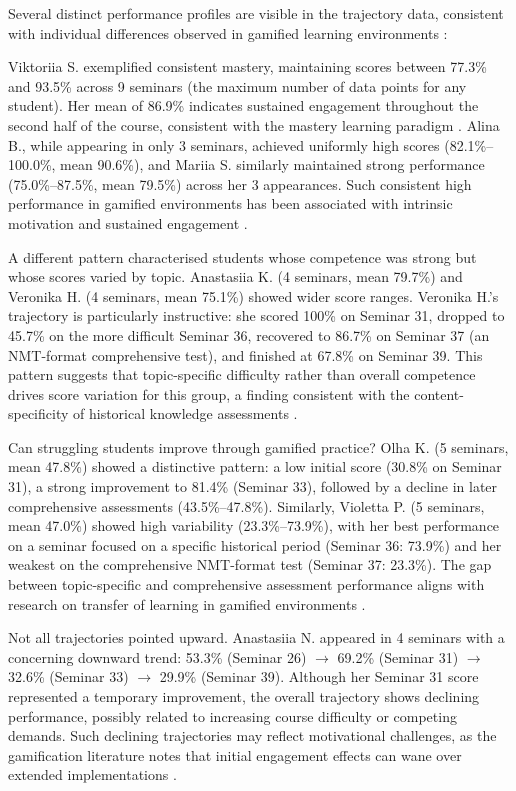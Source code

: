 Several distinct performance profiles are visible in the trajectory data, consistent with individual differences observed in gamified learning environments \cite{Qian2016, Lampropoulos2024, Schafer2017}:

Viktoriia S. exemplified consistent mastery, maintaining scores between 77.3\% and 93.5\% across 9 seminars (the maximum number of data points for any student). Her mean of 86.9\% indicates sustained engagement throughout the second half of the course, consistent with the mastery learning paradigm \cite{Hattie2009}. Alina B., while appearing in only 3 seminars, achieved uniformly high scores (82.1\%--100.0\%, mean 90.6\%), and Mariia S. similarly maintained strong performance (75.0\%--87.5\%, mean 79.5\%) across her 3 appearances. Such consistent high performance in gamified environments has been associated with intrinsic motivation and sustained engagement \cite{Sailer2017, Hamari2014}.

A different pattern characterised students whose competence was strong but whose scores varied by topic. Anastasiia K. (4 seminars, mean 79.7\%) and Veronika H. (4 seminars, mean 75.1\%) showed wider score ranges. Veronika H.'s trajectory is particularly instructive: she scored 100\% on Seminar 31, dropped to 45.7\% on the more difficult Seminar 36, recovered to 86.7\% on Seminar 37 (an NMT-format comprehensive test), and finished at 67.8\% on Seminar 39. This pattern suggests that topic-specific difficulty rather than overall competence drives score variation for this group, a finding consistent with the content-specificity of historical knowledge assessments \cite{Reisman2012, MonteSano2012, Ethier202311}.

Can struggling students improve through gamified practice? Olha K. (5 seminars, mean 47.8\%) showed a distinctive pattern: a low initial score (30.8\% on Seminar 31), a strong improvement to 81.4\% (Seminar 33), followed by a decline in later comprehensive assessments (43.5\%--47.8\%). Similarly, Violetta P. (5 seminars, mean 47.0\%) showed high variability (23.3\%--73.9\%), with her best performance on a seminar focused on a specific historical period (Seminar 36: 73.9\%) and her weakest on the comprehensive NMT-format test (Seminar 37: 23.3\%). The gap between topic-specific and comprehensive assessment performance aligns with research on transfer of learning in gamified environments \cite{Clark2016, Connolly2012, 44Shiue2016}.

Not all trajectories pointed upward. Anastasiia N. appeared in 4 seminars with a concerning downward trend: 53.3\% (Seminar 26) $\rightarrow$ 69.2\% (Seminar 31) $\rightarrow$ 32.6\% (Seminar 33) $\rightarrow$ 29.9\% (Seminar 39). Although her Seminar 31 score represented a temporary improvement, the overall trajectory shows declining performance, possibly related to increasing course difficulty or competing demands. Such declining trajectories may reflect motivational challenges, as the gamification literature notes that initial engagement effects can wane over extended implementations \cite{Hamari2014, KoivistoHamari2019, DichevDicheva2017}.

